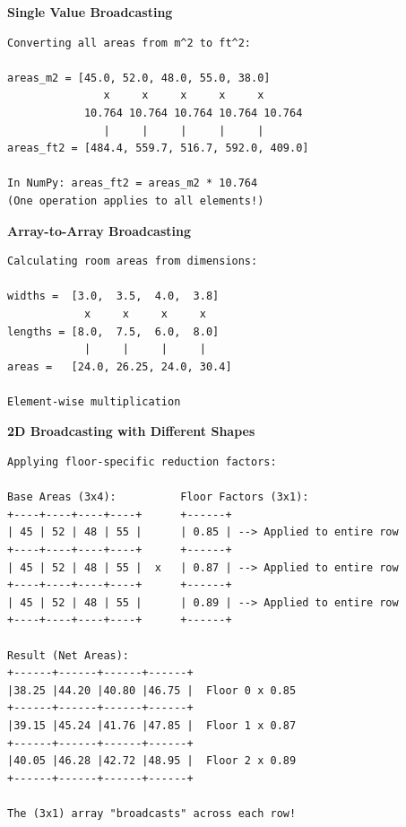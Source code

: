 \begin{tcolorbox}[
    title=Broadcasting Visualized,
    colframe=green,
    colback = white,
    arc=2mm
]
\textbf{Single Value Broadcasting}
\begin{lstlisting}[basicstyle=\ttfamily\footnotesize,breaklines=true,columns=fullflexible,keepspaces=true,xleftmargin=0pt]
Converting all areas from m^2 to ft^2:

areas_m2 = [45.0, 52.0, 48.0, 55.0, 38.0]
               x     x     x     x     x
            10.764 10.764 10.764 10.764 10.764
               |     |     |     |     |
areas_ft2 = [484.4, 559.7, 516.7, 592.0, 409.0]

In NumPy: areas_ft2 = areas_m2 * 10.764
(One operation applies to all elements!)

\end{lstlisting}

\textbf{Array-to-Array Broadcasting}
\begin{lstlisting}[basicstyle=\ttfamily\footnotesize,breaklines=true,columns=fullflexible,keepspaces=true,xleftmargin=0pt]
Calculating room areas from dimensions:

widths =  [3.0,  3.5,  4.0,  3.8]
            x     x     x     x
lengths = [8.0,  7.5,  6.0,  8.0]
            |     |     |     |
areas =   [24.0, 26.25, 24.0, 30.4]

Element-wise multiplication

\end{lstlisting}

\textbf{2D Broadcasting with Different Shapes}
\begin{lstlisting}[basicstyle=\ttfamily\footnotesize,breaklines=true,columns=fullflexible,keepspaces=true,xleftmargin=0pt]
Applying floor-specific reduction factors:

Base Areas (3x4):          Floor Factors (3x1):
+----+----+----+----+      +------+
| 45 | 52 | 48 | 55 |      | 0.85 | --> Applied to entire row
+----+----+----+----+      +------+
| 45 | 52 | 48 | 55 |  x   | 0.87 | --> Applied to entire row
+----+----+----+----+      +------+
| 45 | 52 | 48 | 55 |      | 0.89 | --> Applied to entire row
+----+----+----+----+      +------+

Result (Net Areas):
+------+------+------+------+
|38.25 |44.20 |40.80 |46.75 |  Floor 0 x 0.85
+------+------+------+------+
|39.15 |45.24 |41.76 |47.85 |  Floor 1 x 0.87
+------+------+------+------+
|40.05 |46.28 |42.72 |48.95 |  Floor 2 x 0.89
+------+------+------+------+

The (3x1) array "broadcasts" across each row!


\end{lstlisting}
\end{tcolorbox}
